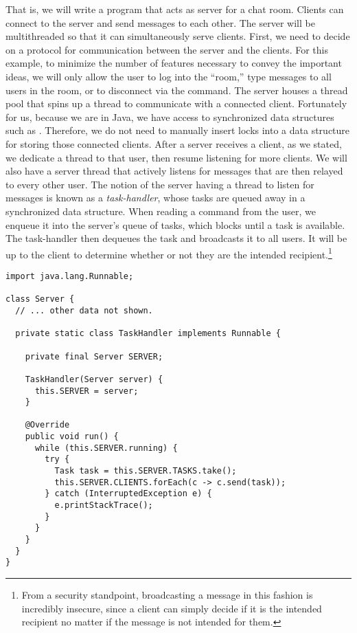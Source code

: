 That is, we will write a program that acts as server for a chat room. 
Clients can connect to the server and send messages to each other. 
The server will be multithreaded so that it can simultaneously serve clients. 
First, we need to decide on a protocol for communication between the server and the clients. 
For this example, to minimize the number of features necessary to convey the important ideas, we will only allow the user to log into the ``room,'' type messages to all users in the room, or to disconnect via the  command. 
The server houses a thread pool that spins up a thread to communicate with a connected client. 
Fortunately for us, because we are in Java, we have access to synchronized data structures such as . 
Therefore, we do not need to manually insert locks into a data structure for storing those connected clients. 
After a server receives a client, as we stated, we dedicate a thread to that user, then resume listening for more clients.
We will also have a server thread that actively listens for messages that are then relayed to every other user. 
The notion of the server having a thread to listen for messages is known as a \emph{task-handler}, whose tasks are queued away in a synchronized  data structure. 
When reading a command from the user, we enqueue it into the server's queue of tasks, which blocks until a task is available. 
The task-handler then dequeues the task and broadcasts it to all users. 
It will be up to the client to determine whether or not they are the intended recipient.\footnote{From a security standpoint, broadcasting a message in this fashion is incredibly insecure, since a client can simply decide if it is the intended recipient no matter if the message is not intended for them.}

\begin{lstlisting}[language=MyJava]
import java.lang.Runnable;

class Server {
  // ... other data not shown.

  private static class TaskHandler implements Runnable {

    private final Server SERVER;

    TaskHandler(Server server) { 
      this.SERVER = server; 
    }

    @Override
    public void run() {
      while (this.SERVER.running) {
        try {
          Task task = this.SERVER.TASKS.take();
          this.SERVER.CLIENTS.forEach(c -> c.send(task));
        } catch (InterruptedException e) { 
          e.printStackTrace(); 
        }
      }
    }
  }
}
\end{lstlisting}

